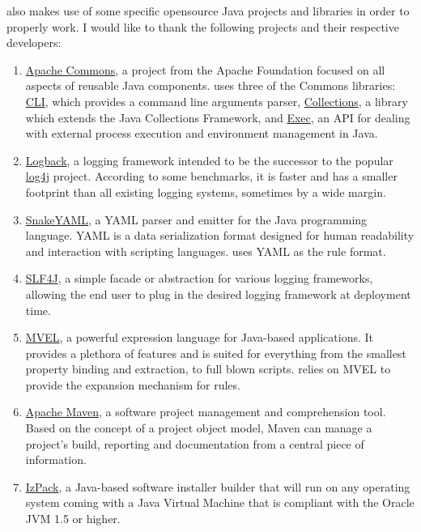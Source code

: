\documentclass[a4paper,twoside,12pt]{memoir}
\begin{document}
\vspace{1em}

\noindent\arara also makes use of some specific opensource Java projects and libraries in order to properly
work. I would like to thank the following projects and their respective developers:

\begin{enumerate}
\item \href{http://commons.apache.org}{Apache Commons}, a project from the Apache Foundation focused
on all aspects of reusable Java components. \arara uses three of the Commons libraries:
\href{http://commons.apache.org/cli/}{CLI}, which provides a command line arguments parser,
\href{http://commons.apache.org/collections/}{Collections}, a library which extends the Java Collections
Framework, and \href{http://commons.apache.org/exec/}{Exec}, an API for dealing with external process
execution and environment management in Java.

\item \href{http://logback.qos.ch}{Logback}, a logging framework intended to be the successor to the
popular \href{http://logging.apache.org/log4j/}{log4j} project. According to some benchmarks, it is faster
and has a smaller footprint than all existing logging systems, sometimes by a wide margin.

\item \href{http://code.google.com/p/snakeyaml}{SnakeYAML}, a YAML parser and emitter for the Java
programming language. YAML is a data serialization format designed for human readability and interaction
with scripting languages. \arara uses YAML as the rule format.

\item \href{http://www.slf4j.org/}{SLF4J}, a simple facade or abstraction for various logging frameworks,
allowing the end user to plug in the desired logging framework at deployment time.

\item \href{http://mvel.codehaus.org}{MVEL}, a powerful expression language for Java-based applications.
It provides a plethora of features and is suited for everything from the smallest property binding and extraction,
to full blown scripts. \arara relies on MVEL to provide the expansion mechanism for rules.

\item \href{http://maven.apache.org/}{Apache Maven}, a software project management and comprehension tool.
Based on the concept of a project object model, Maven can manage a project's build, reporting and documentation
from a central piece of information. 

\item \href{http://izpack.github.com}{IzPack}, a Java-based software installer builder that will run on any
operating system coming with a Java Virtual Machine that is compliant with the Oracle JVM 1.5 or higher.
\end{enumerate}
\end{document}
